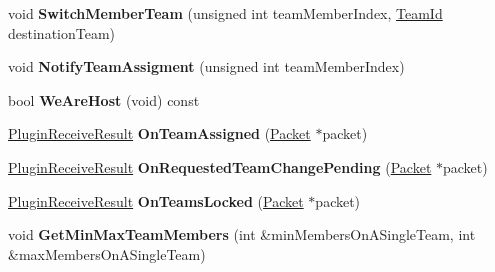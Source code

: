\begin{DoxyCompactItemize}
\item 
\hypertarget{class_rak_net_1_1_team_balancer_a6de6d48e6c1181634bdfe7edc806b94a}{void {\bfseries Switch\-Member\-Team} (unsigned int team\-Member\-Index, \hyperlink{group___t_e_a_m___b_a_l_a_n_c_e_r___g_r_o_u_p_ga79c7825649955f28135498fb3d9f6894}{Team\-Id} destination\-Team)}\label{class_rak_net_1_1_team_balancer_a6de6d48e6c1181634bdfe7edc806b94a}

\item 
\hypertarget{class_rak_net_1_1_team_balancer_a36e600ea67f9942c61a25ec1ba9ad690}{void {\bfseries Notify\-Team\-Assigment} (unsigned int team\-Member\-Index)}\label{class_rak_net_1_1_team_balancer_a36e600ea67f9942c61a25ec1ba9ad690}

\item 
\hypertarget{class_rak_net_1_1_team_balancer_ab496ffbb0543c332a740863a5922a5fe}{bool {\bfseries We\-Are\-Host} (void) const }\label{class_rak_net_1_1_team_balancer_ab496ffbb0543c332a740863a5922a5fe}

\item 
\hypertarget{class_rak_net_1_1_team_balancer_a4157b40193afa7991c58d0c0a0fadd07}{\hyperlink{group___p_l_u_g_i_n___i_n_t_e_r_f_a_c_e___g_r_o_u_p_ga89998adaafb29e5d879113b992161085}{Plugin\-Receive\-Result} {\bfseries On\-Team\-Assigned} (\hyperlink{struct_rak_net_1_1_packet}{Packet} $\ast$packet)}\label{class_rak_net_1_1_team_balancer_a4157b40193afa7991c58d0c0a0fadd07}

\item 
\hypertarget{class_rak_net_1_1_team_balancer_a4077864f1f035e5a42f23c08f8f1e5d0}{\hyperlink{group___p_l_u_g_i_n___i_n_t_e_r_f_a_c_e___g_r_o_u_p_ga89998adaafb29e5d879113b992161085}{Plugin\-Receive\-Result} {\bfseries On\-Requested\-Team\-Change\-Pending} (\hyperlink{struct_rak_net_1_1_packet}{Packet} $\ast$packet)}\label{class_rak_net_1_1_team_balancer_a4077864f1f035e5a42f23c08f8f1e5d0}

\item 
\hypertarget{class_rak_net_1_1_team_balancer_a3646e09eef560cb73d715605837577e0}{\hyperlink{group___p_l_u_g_i_n___i_n_t_e_r_f_a_c_e___g_r_o_u_p_ga89998adaafb29e5d879113b992161085}{Plugin\-Receive\-Result} {\bfseries On\-Teams\-Locked} (\hyperlink{struct_rak_net_1_1_packet}{Packet} $\ast$packet)}\label{class_rak_net_1_1_team_balancer_a3646e09eef560cb73d715605837577e0}

\item 
\hypertarget{class_rak_net_1_1_team_balancer_ae4c620e0f442b17a0b830b0cf24f56f9}{void {\bfseries Get\-Min\-Max\-Team\-Members} (int \&min\-Members\-On\-A\-Single\-Team, int \&max\-Members\-On\-A\-Single\-Team)}\label{class_rak_net_1_1_team_balancer_ae4c620e0f442b17a0b830b0cf24f56f9}


\end{DoxyCompactItemize}
